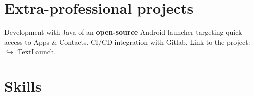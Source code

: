 \documentclass[10pt,a4paper,sans]{moderncv}%
\begin{document}
\section{Extra-professional projects}
    {Development with Java of an \textbf{open-source} Android launcher targeting quick access to Apps \& Contacts. CI/CD integration with Gitlab. Link to the project: \href{https://gitlab.com/MisterFruits/TextLaunch}{$\hookrightarrow$ TextLaunch}.}


\section{Skills}

\end{document}
